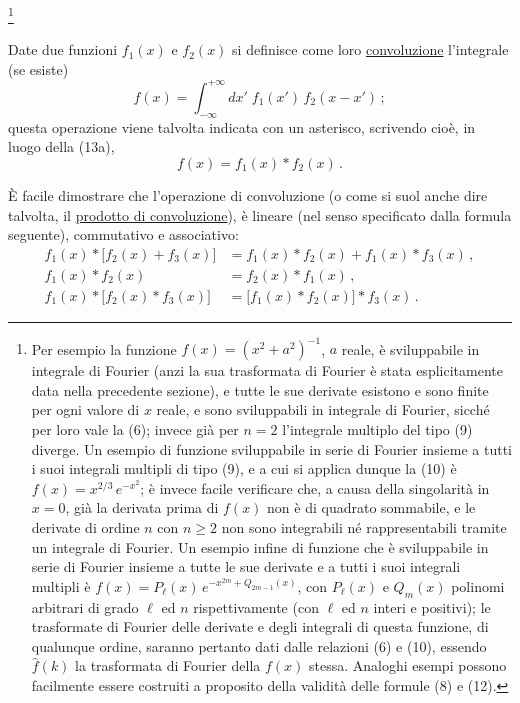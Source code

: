 \documentclass[11pt, a4paper]{book}
\numberwithin{equation}{section}
\begin{document}
\footnote{Per esempio la funzione $f(x) = (x^2+a^2)^{-1}$, $a$ reale, è sviluppabile in integrale di Fourier (anzi la sua trasformata di Fourier è stata esplicitamente data nella precedente sezione), e tutte le sue derivate esistono e sono finite per ogni valore di $x$ reale, e sono sviluppabili in integrale di Fourier, sicché per loro vale la (6); invece già per $n=2$ l'integrale multiplo del tipo (9) diverge. Un esempio di funzione sviluppabile in serie di Fourier insieme a tutti i suoi integrali multipli di tipo (9), e a cui si applica dunque la (10) è $f(x) = x^{2/3}\,e^{-x^2}$; è invece facile verificare che, a causa della singolarità in $x=0$, già la derivata prima di $f(x)$ non è di quadrato sommabile, e le derivate di ordine $n$ con $n\geq2$ non sono integrabili né rappresentabili tramite un integrale di Fourier. Un esempio infine di funzione che è sviluppabile in serie di Fourier insieme a tutte le sue derivate e a tutti i suoi integrali multipli è $f(x) = P_\ell(x)\,e^{-x^{2m}+Q_{2m-1}(x)}$, con $P_\ell(x)$ e $Q_m(x)$ polinomi arbitrari di grado $\ell$ ed $n$ rispettivamente (con $\ell$ ed $n$ interi e positivi); le trasformate di Fourier delle derivate e degli integrali di questa funzione, di qualunque ordine, saranno pertanto dati dalle relazioni (6) e (10), essendo $\hat{f}(k)$ la trasformata di Fourier della $f(x)$ stessa. Analoghi esempi possono facilmente essere costruiti a proposito della validità delle formule (8) e (12).}

Date due funzioni $f_1(x)$ e $f_2(x)$ si definisce come loro \uline{convoluzione} l'integrale (se esiste)
\begin{equation}
  f(x) = \int_{-\infty}^{+\infty} dx'\;f_1(x')\,f_2(x-x')\,; \tag{13a}
\end{equation}
questa operazione viene talvolta indicata con un asterisco, scrivendo cioè, in luogo della (13a),
\begin{equation}
  f(x) = f_1(x) * f_2(x)\,. \tag{13b}
\end{equation}

È facile dimostrare che l'operazione di convoluzione (o come si suol anche dire talvolta, il \uline{prodotto di convoluzione}), è lineare (nel senso specificato dalla formula seguente), commutativo e associativo:
\begin{align}
  f_1(x)*\bigl[f_2(x)+f_3(x)\bigr] &= f_1(x)*f_2(x)+f_1(x)*f_3(x)\,, \tag{14}\\
  f_1(x)*f_2(x) &= f_2(x)*f_1(x)\,, \tag{15}\\
  f_1(x)*\bigl[f_2(x)*f_3(x)\bigr] &= \bigl[f_1(x)*f_2(x)\bigr]*f_3(x)\,. \tag{16}
\end{align}
\end{document}
